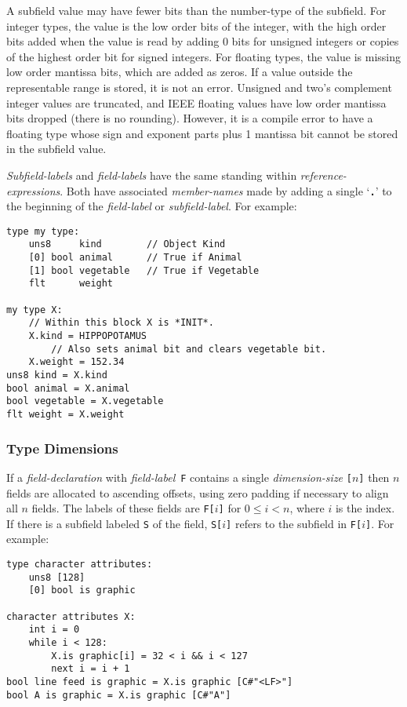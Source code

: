 \documentclass[12pt]{article}
\newcommand{\TT}[1]{{\tt \bfseries #1}}
\newenvironment{indpar}[1][0.3in]%
	{\begin{list}{}%
		     {\setlength{\itemsep}{0in}%
		      \setlength{\topsep}{0in}%
		      \setlength{\parsep}{1ex}%
		      \setlength{\labelwidth}{#1}%
		      \setlength{\leftmargin}{#1}%
		      \addtolength{\leftmargin}{\labelsep}}%
	 \item}%
	{\end{list}}
\begin{document}
A subfield value may have fewer bits than the number-type of the subfield.
For integer types, the value is the low order bits of the integer, with
the high order bits added when the value is read by adding 0 bits
for unsigned integers or copies of the highest order bit for signed integers.
For floating types, the value is missing low order mantissa bits, which
are added as zeros.  If a value outside the representable range is stored,
it is not an error.  Unsigned and two's complement
integer values are truncated, and IEEE floating values
have low order mantissa bits dropped (there is no rounding).  However, it is
a compile error to have a floating type whose sign and exponent parts plus
1 mantissa bit cannot be stored in the subfield value.

{\em Subfield-labels} and {\em field-labels} have the same standing within
{\em reference-expressions}.
Both have associated {\em member-names} made by adding a single
`\TT{.}' to the beginning of the {\em field-label} or {\em subfield-label}.
For example:

\begin{indpar}\begin{verbatim}
type my type:
    uns8     kind        // Object Kind
    [0] bool animal      // True if Animal
    [1] bool vegetable   // True if Vegetable
    flt      weight

my type X:
    // Within this block X is *INIT*.
    X.kind = HIPPOPOTAMUS
        // Also sets animal bit and clears vegetable bit.
    X.weight = 152.34
uns8 kind = X.kind
bool animal = X.animal
bool vegetable = X.vegetable
flt weight = X.weight
\end{verbatim}\end{indpar}

\subsubsection{Type Dimensions}

If a {\em field-declaration} with {\em field-label}\, {\tt F} contains
a single {\em dimension-size} {\tt [$n$]} then $n$ fields are
allocated to ascending offsets, using zero padding
if necessary to align all $n$ fields.  The labels of these
fields are {\tt F[$i$]} for $0\le i<n$, where $i$ is the index.
If there is a subfield
labeled {\tt S} of the field, {\tt S[$i$]} refers to the
subfield in {\tt F[$i$]}.  For example:

\begin{indpar}\begin{verbatim}
type character attributes:
    uns8 [128]
    [0] bool is graphic

character attributes X:
    int i = 0
    while i < 128:
        X.is graphic[i] = 32 < i && i < 127
        next i = i + 1
bool line feed is graphic = X.is graphic [C#"<LF>"]
bool A is graphic = X.is graphic [C#"A"]
\end{verbatim}\end{indpar}
\end{document}
